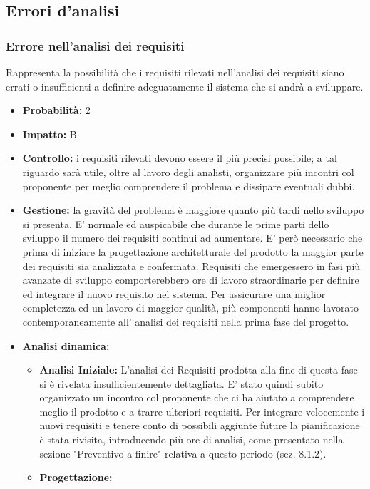 \documentclass[a4paper,11pt]{article}
\begin{document}
	\subsection{Errori d'analisi}
		\subsubsection{Errore nell'analisi dei requisiti}
		Rappresenta la possibilità che i requisiti rilevati nell'analisi dei requisiti siano errati o insufficienti a definire adeguatamente il sistema che si andrà a sviluppare.
		\begin{itemize}
		\item \textbf{Probabilità:} 2
		\item \textbf{Impatto:} B
		\item \textbf{Controllo:} i requisiti rilevati devono essere il più precisi possibile; a tal riguardo sarà utile, oltre al lavoro degli analisti, organizzare più incontri col proponente per meglio comprendere il problema e dissipare eventuali dubbi.
		\item \textbf{Gestione:} la gravità del problema è maggiore quanto più tardi nello sviluppo si presenta. E' normale ed auspicabile che durante le prime parti dello sviluppo il numero dei requisiti continui ad aumentare. E' però necessario che prima di iniziare la progettazione architetturale del prodotto la maggior parte dei requisiti sia analizzata e confermata. Requisiti che emergessero in fasi più avanzate di sviluppo comporterebbero ore di lavoro straordinarie per definire ed integrare il nuovo requisito nel sistema. Per assicurare una miglior completezza ed un lavoro di maggior qualità, più componenti hanno lavorato contemporaneamente all' analisi dei requisiti nella prima fase del progetto.
		\item \textbf{Analisi dinamica:}
			\begin{itemize}
				\item\textbf{Analisi Iniziale:} L'analisi dei Requisiti prodotta alla fine di questa fase si è rivelata insufficientemente dettagliata. E' stato quindi subito organizzato un incontro col proponente che ci ha aiutato a comprendere meglio il prodotto e a trarre ulteriori requisiti. Per integrare velocemente i nuovi requisiti e tenere conto di possibili aggiunte future la pianificazione è stata rivisita, introducendo più ore di analisi, come presentato nella sezione "Preventivo a finire" relativa a questo periodo (sez. 8.1.2).
				\item\textbf{Progettazione:}
			\end{itemize}
		\end{itemize}
\end{document}
